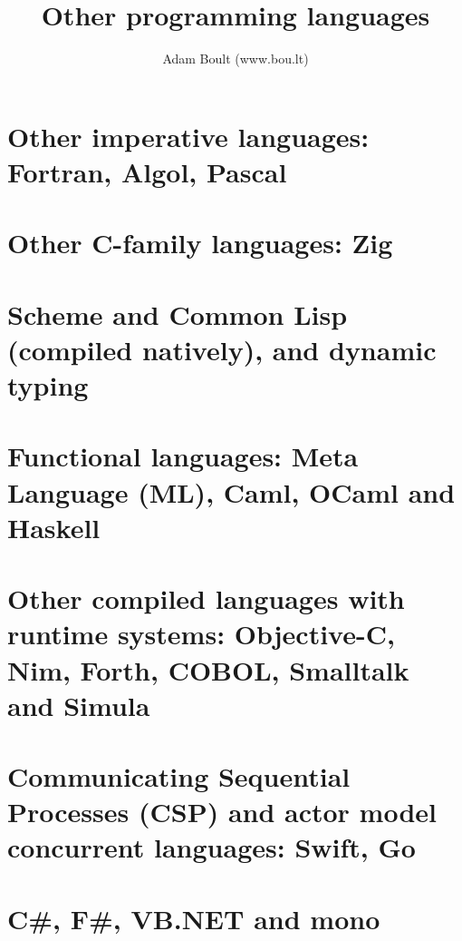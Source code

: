\documentclass[oneside]{book}
\begin{document}
\author{Adam Boult (www.bou.lt)}
\title{Other programming languages}
\maketitle

\setcounter{tocdepth}{0}
\tableofcontents



\part{Other imperative languages: Fortran, Algol, Pascal}





\part{Other C-family languages: Zig}


\part{Scheme and Common Lisp (compiled natively), and dynamic typing}






\part{Functional languages: Meta Language (ML), Caml, OCaml and Haskell}


\part{Other compiled languages with runtime systems: Objective-C, Nim, Forth, COBOL, Smalltalk and Simula}



\part{Communicating Sequential Processes (CSP) and actor model concurrent languages: Swift, Go}


\part{C\#, F\#, VB.NET and mono}

\end{document}
